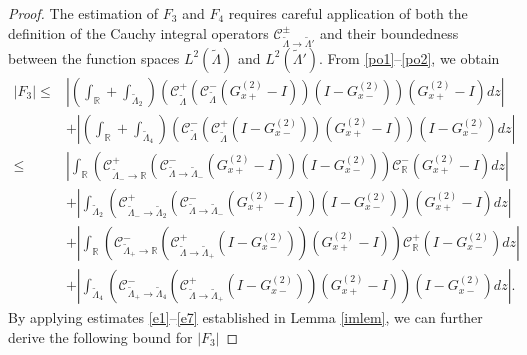 \documentclass[preprint,compress,12pt]{elsarticle}
\numberwithin{equation}{section}
\begin{document}
\begin{proof}
The estimation of $F_{3}$ and $F_{4}$ requires careful application of both the definition of the Cauchy integral operators $\mathcal{C}_{\widetilde{\Lambda}\rightarrow\widetilde{\Lambda}'}^{\pm}$ and their boundedness between the function spaces $L^{2}(\widetilde{\Lambda})$ and $L^{2}(\widetilde{\Lambda}')$. From \eqref{po1}--\eqref{po2}, we obtain
\begin{equation}
\begin{aligned}\nonumber
\left|F_{3}\right|\leq&\left|\left(\int_{\mathbb{R}}+\int_{\widetilde{\Lambda}_{2}}\right)\left(\mathcal{C}_{\widetilde{\Lambda}}^{+}\left(\mathcal{C}_{\widetilde{\Lambda}}^{-}\left(G^{(2)}_{x+}-I\right)\right)\left(I-G^{(2)}_{x-}\right)\right)\left(G^{(2)}_{x+}-I\right)dz\right|\\
&+\left|\left(\int_{\mathbb{R}}+\int_{\widetilde{\Lambda}_{4}}\right)\left(\mathcal{C}_{\widetilde{\Lambda}}^{-}\left(\mathcal{C}_{\widetilde{\Lambda}}^{+}\left(I-G^{(2)}_{x-}\right)\right)\left(G^{(2)}_{x+}-I\right)\right)\left(I-G^{(2)}_{x-}\right)dz\right|\\
\leq&\left|\int_{\mathbb{R}}\left(\mathcal{C}_{\widetilde{\Lambda}_{-}\rightarrow\mathbb{R}}^{+}\left(\mathcal{C}_{\widetilde{\Lambda}\rightarrow\widetilde{\Lambda}_{-}}^{-}\left(G^{(2)}_{x+}-I\right)\right)\left(I-G^{(2)}_{x-}\right)\right)\mathcal{C}_{\mathbb{R}}^{-}\left(G^{(2)}_{x+}-I\right)dz\right|\\
&+\left|\int_{\widetilde{\Lambda}_{2}}\left(\mathcal{C}_{\widetilde{\Lambda}_{-}\rightarrow\widetilde{\Lambda}_{2}}^{+}\left(\mathcal{C}_{\widetilde{\Lambda}\rightarrow\widetilde{\Lambda}_{-}}^{-}\left(G^{(2)}_{x+}-I\right)\right)\left(I-G^{(2)}_{x-}\right)\right)\left(G^{(2)}_{x+}-I\right)dz\right|\\
&+\left|\int_{\mathbb{R}}\left(\mathcal{C}_{\widetilde{\Lambda}_{+}\rightarrow\mathbb{R}}^{-}\left(\mathcal{C}_{\widetilde{\Lambda}\rightarrow\widetilde{\Lambda}_{+}}^{+}\left(I-G^{(2)}_{x-}\right)\right)\left(G^{(2)}_{x+}-I\right)\right)\mathcal{C}_{\mathbb{R}}^{+}\left(I-G^{(2)}_{x-}\right)dz\right|\\
&+\left|\int_{\widetilde{\Lambda}_{4}}\left(\mathcal{C}_{\widetilde{\Lambda}_{+}\rightarrow\widetilde{\Lambda}_{4}}^{-}\left(\mathcal{C}_{\widetilde{\Lambda}\rightarrow\widetilde{\Lambda}_{+}}^{+}\left(I-G^{(2)}_{x-}\right)\right)\left(G^{(2)}_{x+}-I\right)\right)\left(I-G^{(2)}_{x-}\right)dz\right|.
\end{aligned}
\end{equation}
By applying estimates \eqref{e1}--\eqref{e7} established in Lemma \ref{imlem}, we can further derive the following bound for $\left|F_{3}\right|$

\end{proof}
\end{document}
